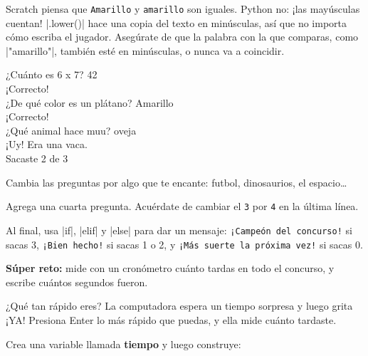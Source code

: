 \begin{watchout}
Scratch piensa que \texttt{Amarillo} y \texttt{amarillo} son iguales. Python no: ¡las mayúsculas cuentan! \py|.lower()| hace una copia del texto en minúsculas, así que no importa cómo escriba el jugador. Asegúrate de que la palabra con la que comparas, como \py|"amarillo"|, también esté en minúsculas, o nunca va a coincidir.
\end{watchout}


\begin{outputbox}
¿Cuánto es 6 x 7? 42\\
¡Correcto!\\
¿De qué color es un plátano? Amarillo\\
¡Correcto!\\
¿Qué animal hace muu? oveja\\
¡Uy! Era una vaca.\\
Sacaste 2 de 3
\end{outputbox}

\begin{challenge}
\tick Cambia las preguntas por algo que te encante: futbol, dinosaurios, el espacio\ldots\par
\tick Agrega una cuarta pregunta. Acuérdate de cambiar el \texttt{3} por \texttt{4} en la última línea.\par
\tick Al final, usa \py|if|, \py|elif| y \py|else| para dar un mensaje: \texttt{¡Campeón del concurso!} si sacas 3, \texttt{¡Bien hecho!} si sacas 1 o 2, y \texttt{¡Más suerte la próxima vez!} si sacas 0.\par
\tick \textbf{Súper reto:} mide con un cronómetro cuánto tardas en todo el concurso, y escribe cuántos segundos fueron.
\end{challenge}


¿Qué tan rápido eres? La computadora espera un tiempo sorpresa y luego grita ¡YA! Presiona Enter lo más rápido que puedas, y ella mide cuánto tardaste.

Crea una variable llamada \textbf{tiempo} y luego construye:

